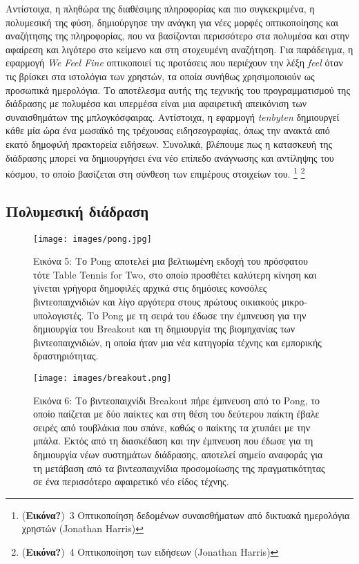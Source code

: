 \documentclass[
]{article}
\begin{document}
Αντίστοιχα, η πληθώρα της διαθέσιμης πληροφορίας και πιο συγκεκριμένα, η
πολυμεσική της φύση, δημιούργησε την ανάγκη για νέες μορφές
οπτικοποίησης και αναζήτησης της πληροφορίας, που να βασίζονται
περισσότερο στα πολυμέσα και στην αφαίρεση και λιγότερο στο κείμενο και
στη στοχευμένη αναζήτηση. Για παράδειγμα, η εφαρμογή \emph{We Feel Fine}
οπτικοποιεί τις προτάσεις που περιέχουν την λέξη \emph{feel} όταν τις
βρίσκει στα ιστολόγια των χρηστών, τα οποία συνήθως χρησιμοποιούν ως
προσωπικά ημερολόγια. Το αποτέλεσμα αυτής της τεχνικής του
προγραμματισμού της διάδρασης με πολυμέσα και υπερμέσα είναι μια
αφαιρετική απεικόνιση των συναισθημάτων της μπλογκόσφαιρας. Αντίστοιχα,
η εφαρμογή \emph{tenbyten} δημιουργεί κάθε μία ώρα ένα μωσαϊκό της
τρέχουσας ειδησεογραφίας, όπως την ανακτά από εκατό δημοφιλή πρακτορεία
ειδήσεων. Συνολικά, βλέπουμε πως η κατασκευή της διάδρασης μπορεί να
δημιουργήσει ένα νέο επίπεδο ανάγνωσης και αντίληψης του κόσμου, το
οποίο βασίζεται στη σύνθεση των επιμέρους στοιχείων του. \footnote{(\textbf{Εικόνα?})~3
  Οπτικοποίηση δεδομένων συναισθήματων από δικτυακά ημερολόγια χρηστών
  (Jonathan Harris)} \footnote{(\textbf{Εικόνα?})~4 Οπτικοποίηση των
  ειδήσεων (Jonathan Harris)}

\hypertarget{ux3c0ux3bfux3bbux3c5ux3bcux3b5ux3c3ux3b9ux3baux3ae-ux3b4ux3b9ux3acux3b4ux3c1ux3b1ux3c3ux3b7}{%
\subsection{Πολυμεσική
διάδραση}\label{ux3c0ux3bfux3bbux3c5ux3bcux3b5ux3c3ux3b9ux3baux3ae-ux3b4ux3b9ux3acux3b4ux3c1ux3b1ux3c3ux3b7}}

\leavevmode{}%
\begin{figure}
\hypertarget{fig:pong}{%
\centering
\texttt{[image: images/pong.jpg]}
\caption{Εικόνα 5: Το Pong αποτελεί μια βελτιωμένη εκδοχή του πρόσφατου
τότε Table Tennis for Two, στο οποίο προσθέτει καλύτερη κίνηση και
γίνεται γρήγορα δημοφιλές αρχικά στις δημόσιες κονσόλες βιντεοπαιχνιδιών
και λίγο αργότερα στους πρώτους οικιακούς μικρο-υπολογιστές. Tο Pong με
τη σειρά του έδωσε την έμπνευση για την δημιουργία του Breakout και τη
δημιουργία της βιομηχανίας των βιντεοπαιχνιδιών, η οποία ήταν μια νέα
κατηγορία τέχνης και εμπορικής δραστηριότητας.}\label{fig:pong}
}
\end{figure}

\leavevmode{}%
\begin{figure}
\hypertarget{fig:breakout}{%
\centering
\texttt{[image: images/breakout.png]}
\caption{Εικόνα 6: Το βιντεοπαιχνίδι Breakout πήρε έμπνευση από το Pong,
το οποίο παίζεται με δύο παίκτες και στη θέση του δεύτερου παίκτη έβαλε
σειρές από τουβλάκια που σπάνε, καθώς ο παίκτης τα χτυπάει με την μπάλα.
Εκτός από τη διασκέδαση και την έμπνευση που έδωσε για τη δημιουργία
νέων συστημάτων διάδρασης, αποτελεί σημείο αναφοράς για τη μετάβαση από
τα βιντεοπαιχνίδια προσομοίωσης της πραγματικότητας σε ένα περισσότερο
αφαιρετικό νέο είδος τέχνης.}\label{fig:breakout}
}
\end{figure}
\end{document}
